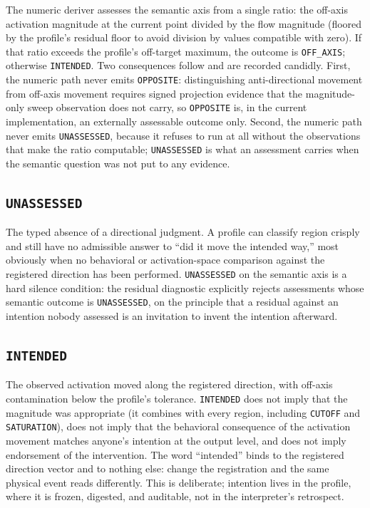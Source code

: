 The numeric deriver assesses the semantic axis from a single ratio: the
off-axis activation magnitude at the current point divided by the flow
magnitude (floored by the profile's residual floor to avoid division by
values compatible with zero). If that ratio exceeds the profile's off-target
maximum, the outcome is \texttt{OFF\_AXIS}; otherwise \texttt{INTENDED}. Two
consequences follow and are recorded candidly. First, the numeric path never
emits \texttt{OPPOSITE}: distinguishing anti-directional movement from
off-axis movement requires signed projection evidence that the magnitude-only
sweep observation does not carry, so \texttt{OPPOSITE} is, in the current
implementation, an externally assessable outcome only. Second, the numeric
path never emits \texttt{UNASSESSED}, because it refuses to run at all
without the observations that make the ratio computable; \texttt{UNASSESSED}
is what an assessment carries when the semantic question was not put to any
evidence.

\subsection{\texttt{UNASSESSED}}

The typed absence of a directional judgment. A profile can classify region
crisply and still have no admissible answer to ``did it move the intended
way,'' most obviously when no behavioral or activation-space comparison
against the registered direction has been performed. \texttt{UNASSESSED} on
the semantic axis is a hard silence condition: the residual diagnostic
explicitly rejects assessments whose semantic outcome is \texttt{UNASSESSED},
on the principle that a residual against an intention nobody assessed is an
invitation to invent the intention afterward.

\subsection{\texttt{INTENDED}}

The observed activation moved along the registered direction, with off-axis
contamination below the profile's tolerance. \texttt{INTENDED} does not
imply that the magnitude was appropriate (it combines with every region,
including \texttt{CUTOFF} and \texttt{SATURATION}), does not imply that the
behavioral consequence of the activation movement matches anyone's intention
at the output level, and does not imply endorsement of the intervention. The
word ``intended'' binds to the registered direction vector and to nothing
else: change the registration and the same physical event reads differently.
This is deliberate; intention lives in the profile, where it is frozen,
digested, and auditable, not in the interpreter's retrospect.


